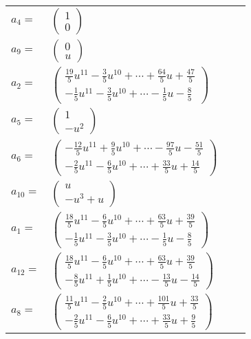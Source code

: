 \documentclass[1p]{elsarticle_modified}
\theoremstyle{definition}
\begin{document}
\begin{tabular}{m{7pt} m{180pt} m{7pt} m{180pt} }
\flushright $a_{4}=$&$\begin{pmatrix}1\\0\end{pmatrix}$ \\
\flushright $a_{9}=$&$\begin{pmatrix}0\\u\end{pmatrix}$ \\
\flushright $a_{2}=$&$\begin{pmatrix}\frac{19}{5} u^{11}-\frac{3}{5} u^{10}+\cdots+\frac{64}{5} u+\frac{47}{5}\\-\frac{1}{5} u^{11}-\frac{3}{5} u^{10}+\cdots-\frac{1}{5} u-\frac{8}{5}\end{pmatrix}$ \\
\flushright $a_{5}=$&$\begin{pmatrix}1\\- u^2\end{pmatrix}$ \\
\flushright $a_{6}=$&$\begin{pmatrix}-\frac{12}{5} u^{11}+\frac{9}{5} u^{10}+\cdots-\frac{97}{5} u-\frac{51}{5}\\-\frac{2}{5} u^{11}-\frac{6}{5} u^{10}+\cdots+\frac{33}{5} u+\frac{14}{5}\end{pmatrix}$ \\
\flushright $a_{10}=$&$\begin{pmatrix}u\\- u^3+u\end{pmatrix}$ \\
\flushright $a_{1}=$&$\begin{pmatrix}\frac{18}{5} u^{11}-\frac{6}{5} u^{10}+\cdots+\frac{63}{5} u+\frac{39}{5}\\-\frac{1}{5} u^{11}-\frac{3}{5} u^{10}+\cdots-\frac{1}{5} u-\frac{8}{5}\end{pmatrix}$ \\
\flushright $a_{12}=$&$\begin{pmatrix}\frac{18}{5} u^{11}-\frac{6}{5} u^{10}+\cdots+\frac{63}{5} u+\frac{39}{5}\\-\frac{8}{5} u^{11}+\frac{1}{5} u^{10}+\cdots-\frac{13}{5} u-\frac{14}{5}\end{pmatrix}$ \\
\flushright $a_{8}=$&$\begin{pmatrix}\frac{11}{5} u^{11}-\frac{2}{5} u^{10}+\cdots+\frac{101}{5} u+\frac{33}{5}\\-\frac{2}{5} u^{11}-\frac{6}{5} u^{10}+\cdots+\frac{33}{5} u+\frac{9}{5}\end{pmatrix}$ \\

\end{tabular}
\end{document}

